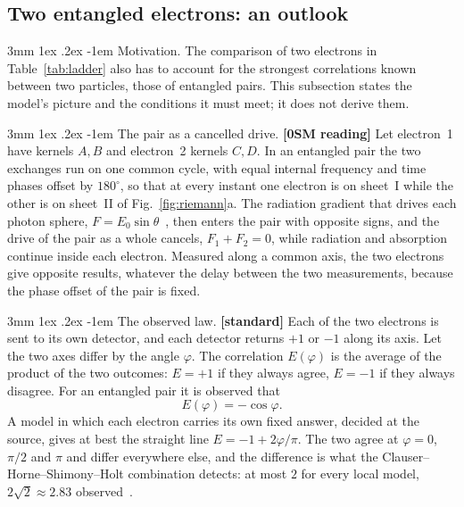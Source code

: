 \documentclass[%
 reprint, amsmath,amssymb, aps, prb, ]{revtex4-2}
\makeatletter
\numberwithin{equation}{section}
\renewcommand\paragraph{%
  \@startsection{paragraph}{4}{\z@}%
    {3mm \@plus 1ex \@minus .2ex}%
    {-1em}%
    {\normalfont\normalsize\itshape}}
\makeatother
\begin{document}
\subsection{Two entangled electrons: an outlook}
\label{sec:entangle}

\paragraph{Motivation.} The comparison of two electrons in Table~\ref{tab:ladder} also has to account for the strongest correlations known between two particles, those of entangled pairs. This subsection states the model's picture and the conditions it must meet; it does not derive them.

\paragraph{The pair as a cancelled drive.} \textbf{[0SM reading]} Let electron~1 have kernels $A,B$ and electron~2 kernels $C,D$. In an entangled pair the two exchanges run on one common cycle, with equal internal frequency and time phases offset by $180^\circ$, so that at every instant one electron is on sheet~I while the other is on sheet~II of Fig.~\ref{fig:riemann}a. The radiation gradient that drives each photon sphere, $F=E_0\sin\theta$~\cite{ref:p1}, then enters the pair with opposite signs, and the drive of the pair as a whole cancels, $F_1+F_2=0$, while radiation and absorption continue inside each electron. Measured along a common axis, the two electrons give opposite results, whatever the delay between the two measurements, because the phase offset of the pair is fixed.

\paragraph{The observed law.} \textbf{[standard]} Each of the two electrons is sent to its own detector, and each detector returns $+1$ or $-1$ along its axis. Let the two axes differ by the angle $\varphi$. The correlation $E(\varphi)$ is the average of the product of the two outcomes: $E=+1$ if they always agree, $E=-1$ if they always disagree. For an entangled pair it is observed that
\begin{equation}
E(\varphi)=-\cos\varphi .
\label{eq:Eobs}
\end{equation}
A model in which each electron carries its own fixed answer, decided at the source, gives at best the straight line $E=-1+2\varphi/\pi$. The two agree at $\varphi=0$, $\pi/2$ and $\pi$ and differ everywhere else, and the difference is what the Clauser--Horne--Shimony--Holt combination detects: at most $2$ for every local model, $2\sqrt2\approx2.83$ observed~\cite{ref:chsh,ref:aspect82}.
\end{document}
